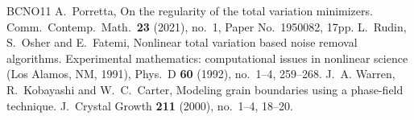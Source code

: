 \documentclass[11pt]{amsart} %
\numberwithin{equation}{section}
\begin{document}
\begin{thebibliography}{BCNO11}
%
A.\ Porretta, 
On the regularity of the total variation minimizers. 
Comm.\ Contemp.\ Math.\ {\bf23} (2021), no.\ 1, Paper No.\ 1950082, 17pp. %
%
L.\ Rudin, S.\ Osher and E.\ Fatemi, 
Nonlinear total variation based noise removal algorithms. 
Experimental mathematics: computational issues in nonlinear science (Los Alamos, NM, 1991), 
Phys.\ D {\bf60} (1992), no.\ 1--4, 259--268.
%
J.\ A. Warren, R.\ Kobayashi and W.\ C.\ Carter, 
Modeling grain boundaries using a phase-field technique. 
J.\ Crystal Growth {\bf211} (2000), no.\ 1--4, 18--20.
%
\end{thebibliography}
\end{document}
